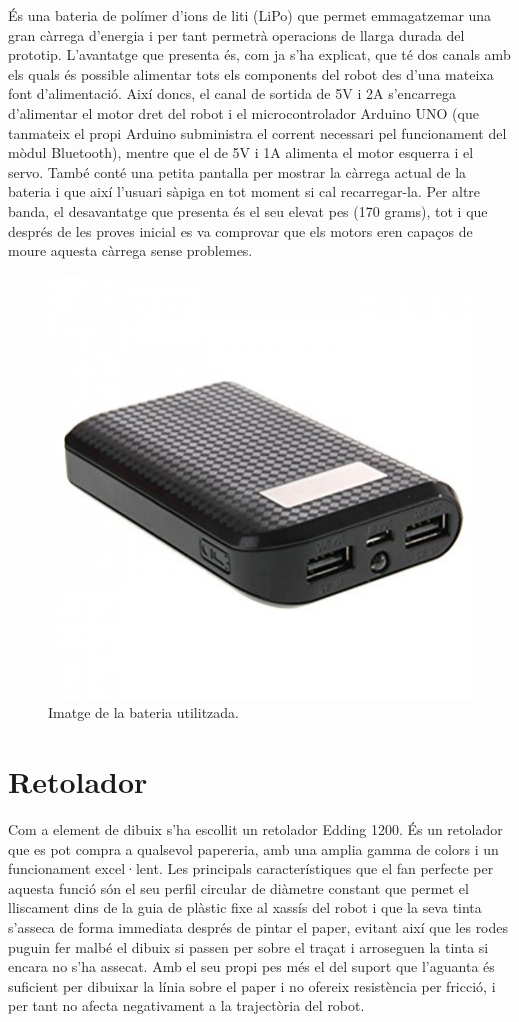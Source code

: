 És una bateria de polímer d’ions de liti (LiPo) que permet emmagatzemar una gran càrrega d’energia i per tant permetrà operacions de llarga durada del prototip. L’avantatge que presenta és, com ja s’ha explicat, que té dos canals amb els quals és possible alimentar tots els components del robot des d'una mateixa font d'alimentació. Així doncs, el canal de sortida de 5V i 2A s’encarrega d’alimentar el motor dret del robot i el microcontrolador Arduino UNO (que tanmateix el propi Arduino subministra el corrent necessari pel funcionament del mòdul Bluetooth), mentre que el de 5V i 1A alimenta el motor esquerra i el servo. També conté una petita pantalla per mostrar la càrrega actual de la bateria i que així l’usuari sàpiga en tot moment si cal recarregar-la. Per altre banda, el desavantatge que presenta és el seu elevat pes (170 grams), tot i que després de les proves inicial es va comprovar que els motors eren capaços de moure aquesta càrrega sense problemes. 

\begin{figure}[H]
	\centering
	\includegraphics[scale=0.4]{bateria.png}
	\caption{Imatge de la bateria utilitzada.}
	\label{fig:bateria}
\end{figure}

\section{Retolador} \label{sec:retolador}

Com a element de dibuix s’ha escollit un retolador Edding 1200. És un retolador que es pot compra a qualsevol papereria, amb una amplia gamma de colors i un funcionament excel·lent. Les principals característiques que el fan perfecte per aquesta funció són el seu perfil circular de diàmetre constant que permet el lliscament dins de la guia de plàstic fixe al xassís del robot i que la seva tinta s’asseca de forma immediata després de pintar el paper, evitant així que les rodes puguin fer malbé el dibuix si passen per sobre el traçat i arroseguen la tinta si encara no s'ha assecat. Amb el seu propi pes més el del suport que l'aguanta és suficient per dibuixar la línia sobre el paper i no ofereix resistència per fricció, i per tant no afecta negativament a la trajectòria del robot. 

